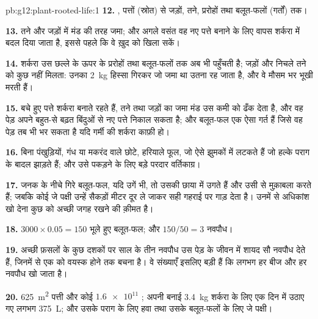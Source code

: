 \begin{solution}{pb:g12:plant-rooted-life:1}
\textbf{12.} , पत्तों (स्रोत) से जड़ों, तने, प्ररोहों तथा बलूत-फलों
(गर्तों) तक।

\textbf{13.} तने और जड़ों में मंड की तरह जमा; और अगले वसंत वह नए पत्ते
बनाने के लिए वापस शर्करा में बदल दिया जाता है, इससे पहले कि वे ख़ुद को खिला
सकें।

\textbf{14.} शर्करा उस छल्ले के ऊपर के प्ररोहों तथा बलूत-फलों तक अब भी
पहुँचती है; जड़ों और निचले तने को कुछ नहीं मिलता: उनका \qty{2}{kg} हिस्सा
गिरकर जो जमा था उतना रह जाता है, और वे मौसम भर भूखी मरती हैं।

\textbf{15.} बचे हुए पत्ते शर्करा बनाते रहते हैं, तने तथा जड़ों का जमा मंड
उस कमी को ढँक देता है, और वह पेड़ अपने बहुत-से बढ़त बिंदुओं से नए पत्ते
निकाल सकता है; और बलूत-फल एक ऐसा गर्त हैं जिसे वह पेड़ तब भी भर सकता है यदि
गर्मी की शर्करा काफ़ी हो।

\textbf{16.} बिना पंखुड़ियों, गंध या मकरंद वाले छोटे, हरियाले फूल, जो ऐसे
झुमकों में लटकते हैं जो हल्के पराग के बादल झाड़ते हैं; और उसे पकड़ने के लिए
बड़े परदार वर्तिकाग्र।

\textbf{17.} जनक के नीचे गिरे बलूत-फल, यदि उगें भी, तो उसकी छाया में उगते
हैं और उसी से मुक़ाबला करते हैं; जबकि कोई जे पक्षी उन्हें सैकड़ों मीटर दूर
ले जाकर सही गहराई पर गाड़ देता है। उनमें से अधिकांश खो देना कुछ को अच्छी
जगह रखने की क़ीमत है।

\textbf{18.} $3000 \times 0.05 = 150$ भूले हुए बलूत-फल; और $150/50 = 3$
नवपौध।

\textbf{19.} अच्छी फ़सलों के कुछ दशकों पर साल के तीन नवपौध उस पेड़ के जीवन
में शायद सौ नवपौध देते हैं, जिनमें से एक को वयस्क होने तक बचना है। वे
संख्याएँ इसलिए बड़ी हैं कि लगभग हर बीज और हर नवपौध खो जाता है।

\textbf{20.} \qty{625}{m^2} पत्ती और कोई $\num{1.6e11}$ ; अपनी बनाई
\qty{3.4}{kg} शर्करा के लिए एक दिन में उठाए गए लगभग \qty{375}{L}; और उसके
पराग के लिए हवा तथा उसके बलूत-फलों के लिए जे पक्षी।
\end{solution}
